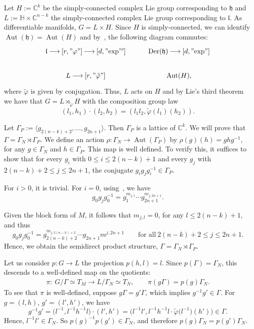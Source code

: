 \documentclass[10pt,a4paper]{amsart}
\newcommand{\C}{{\mathbb C}}
\renewcommand{\H}{{\mathbb H}}
\newcommand{\6}{\partial}
\newcommand{\arrow}{{\:\longrightarrow\:}}
\newcommand{\Aut}{\operatorname{Aut}}
\numberwithin{equation}{section}
\begin{document}
Let $H:=\C^k$ be the simply-connected complex Lie group corresponding to $\mathfrak{h}$ and $L:=\H \times \C^{n-k}$ the simply-connected complex Lie group corresponding to $\mathfrak{l}$. As differentiable manifolds, $G= L \times H$. Since $H$ is simply-connected, we can identify $\Aut(\mathfrak{h})=\Aut(H)$ and by~\cite[Theorem~3]{bry}, the following diagram commutes:
\[
\begin{tikzcd}
	\mathfrak{l} \arrow[r, "\varphi"] \arrow[d, "{\rm exp}"'] & {\rm Der}(\mathfrak{h}) \arrow[d, "{\rm exp}"] \\
	L \arrow[r, "\tilde{\varphi}"] & \Aut(H),
\end{tikzcd}
\] where $\tilde{\varphi}$ is given by conjugation.
Thus, $L$ acts on $H$ and by Lie's third theorem we have that $G=L \rtimes_{\tilde{\varphi}} H$ with the composition group law
\[
(l_1, h_1) \cdot(l_2, h_2)=(l_1l_2, \tilde{\varphi}(l_1)(h_2)).
\]

Let $\Gamma_P:=\bigl\langle g_{2(n-k)+2}, \dots, g_{2n+1}\bigr\rangle$. Then $\Gamma_P$ is a lattice of $\C^k$.
We will prove that $\Gamma=\Gamma_N \rtimes \Gamma_P$.
We define an action $\rho\colon \Gamma_N \longrightarrow \Aut(\Gamma_P)$ by $\rho(g)(h)=ghg^{-1}$, for any $g \in \Gamma_N$ and $h \in \Gamma_P$. This map is well defined. To verify this, it suffices to show that for every $g_i$ with $0 \leq i \leq 2(n-k)+1$ and every $g_j$ with $2(n-k)+2 \leq j \leq 2n+1$, the conjugate $g_ig_jg_i^{-1} \in \Gamma_P$.

For $i>0$, it is trivial.
For $i=0$, using~\cite[Lemma 2.3]{pajitnov1}, we have
\[
g_0g_jg_0^{-1}=g_1^{m_{j,1}} \cdots g_{2n+1}^{m_{j, 2n+1}}.
\]

Given the block form of $M$, it follows that $m_{j,l}=0$, for any $l \leq 2(n-k)+1$, and thus
\[
g_0g_jg_0^{-1}=g_{2(n-k)+2}^{m_{j, 2(n-k)+2}} \cdots g_{2n+1}m^{j, 2n+1} \qquad \text{for all}\ 2(n-k)+2 \leq j \leq 2n+1.
\]
Hence, we obtain the semidirect product structure, $\Gamma=\Gamma_N \rtimes \Gamma_P$.

Let us consider $p\colon G \longrightarrow L$ the projection $p(h,l)=l$.
Since $p(\Gamma)=\Gamma_N$, this descends to a well-defined map on the quotients:
\begin{align*}
\pi\colon \ G/\Gamma \simeq T_M \longrightarrow L/{\Gamma_N} \simeq T_N,\qquad
\pi(g\Gamma)=p(g)\Gamma_N.
\end{align*}
To see that $\pi$ is well-defined, suppose $g\Gamma=g'\Gamma$, which implies $g^{-1}g' \in \Gamma$. For $g=(l,h)$, $g'=(l',h')$, we have
\begin{equation*}
 g^{-1}g'=\big(l^{-1},l^{-1}h^{-1}l\big) \cdot (l',h')=\big(l^{-1}l', l^{-1}h^{-1}l \cdot \tilde{\varphi}\big(l^{-1}\big)(h')\big) \in \Gamma.
\end{equation*}
Hence, $l^{-1}l' \in \Gamma_N$. So $p(g)^{-1}p(g') \in \Gamma_N$, and therefore $p(g)\Gamma_N=p(g')\Gamma_N$.
\end{document}
